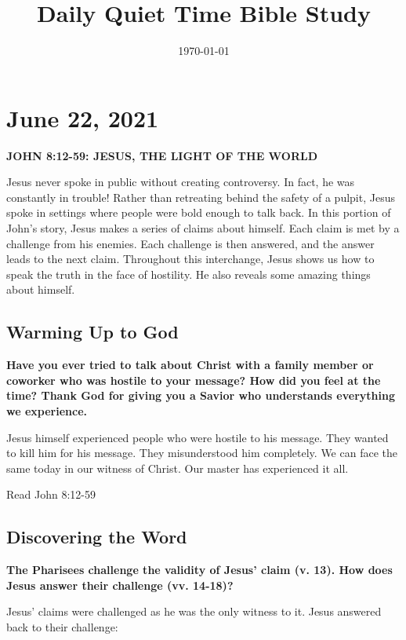 \documentclass[11pt]{article}
\date{\today}
\title{Daily Quiet Time Bible Study}
\begin{document}
\maketitle
\tableofcontents


\section{June 22, 2021}
\label{sec:org009a16c}

\textbf{\textbf{JOHN 8:12-59: JESUS, THE LIGHT OF THE WORLD}}

Jesus never spoke in public without creating controversy. In fact, he
was constantly in trouble! Rather than retreating behind the safety
of a pulpit, Jesus spoke in settings where people were bold enough to
talk back. In this portion of John's story, Jesus makes a series of
claims about himself. Each claim is met by a challenge from his
enemies. Each challenge is then answered, and the answer leads to the
next claim. Throughout this interchange, Jesus shows us how to speak
the truth in the face of hostility. He also reveals some amazing
things about himself.


\subsection{Warming Up to God}
\label{sec:orgc34abf3}


\textbf{\textbf{Have you ever tried to talk about Christ with a family member or coworker who was hostile to your message? How did you feel at the time? Thank God for giving you a Savior who understands everything we experience.}}

Jesus himself experienced people who were hostile to his message. They
wanted to kill him for his message. They misunderstood him
completely. We can face the same today in our witness of Christ. Our
master has experienced it all.

Read John 8:12-59

\subsection{Discovering the Word}
\label{sec:org50ced80}

\textbf{\textbf{The Pharisees challenge the validity of Jesus’ claim (v. 13). How does Jesus answer their challenge (vv. 14-18)?}}

Jesus' claims were challenged as he was the only witness to it. Jesus answered back to their challenge:
\end{document}
